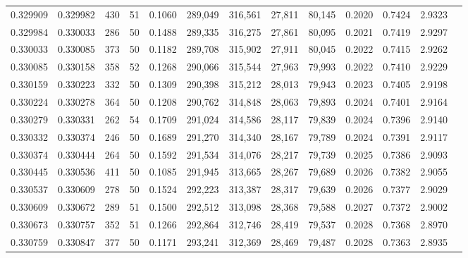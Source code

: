 \begin{tabular}{rrrrrrrrrrrrr}
0.329909 & 0.329982 &   430 &  51 &                                     0.1060 & 289,049 & 316,561 &  27,811 &  80,145 & 0.2020 & 0.7424 & 2.9323 \\
0.329984 & 0.330033 &   286 &  50 &                                     0.1488 & 289,335 & 316,275 &  27,861 &  80,095 & 0.2021 & 0.7419 & 2.9297 \\
0.330033 & 0.330085 &   373 &  50 &                                     0.1182 & 289,708 & 315,902 &  27,911 &  80,045 & 0.2022 & 0.7415 & 2.9262 \\
0.330085 & 0.330158 &   358 &  52 &                                     0.1268 & 290,066 & 315,544 &  27,963 &  79,993 & 0.2022 & 0.7410 & 2.9229 \\
0.330159 & 0.330223 &   332 &  50 &                                     0.1309 & 290,398 & 315,212 &  28,013 &  79,943 & 0.2023 & 0.7405 & 2.9198 \\
0.330224 & 0.330278 &   364 &  50 &                                     0.1208 & 290,762 & 314,848 &  28,063 &  79,893 & 0.2024 & 0.7401 & 2.9164 \\
0.330279 & 0.330331 &   262 &  54 &                                     0.1709 & 291,024 & 314,586 &  28,117 &  79,839 & 0.2024 & 0.7396 & 2.9140 \\
0.330332 & 0.330374 &   246 &  50 &                                     0.1689 & 291,270 & 314,340 &  28,167 &  79,789 & 0.2024 & 0.7391 & 2.9117 \\
0.330374 & 0.330444 &   264 &  50 &                                     0.1592 & 291,534 & 314,076 &  28,217 &  79,739 & 0.2025 & 0.7386 & 2.9093 \\
0.330445 & 0.330536 &   411 &  50 &                                     0.1085 & 291,945 & 313,665 &  28,267 &  79,689 & 0.2026 & 0.7382 & 2.9055 \\
0.330537 & 0.330609 &   278 &  50 &                                     0.1524 & 292,223 & 313,387 &  28,317 &  79,639 & 0.2026 & 0.7377 & 2.9029 \\
0.330609 & 0.330672 &   289 &  51 &                                     0.1500 & 292,512 & 313,098 &  28,368 &  79,588 & 0.2027 & 0.7372 & 2.9002 \\
0.330673 & 0.330757 &   352 &  51 &                                     0.1266 & 292,864 & 312,746 &  28,419 &  79,537 & 0.2028 & 0.7368 & 2.8970 \\
0.330759 & 0.330847 &   377 &  50 &                                     0.1171 & 293,241 & 312,369 &  28,469 &  79,487 & 0.2028 & 0.7363 & 2.8935 \\

\end{tabular}

